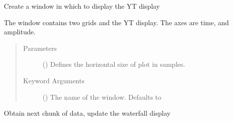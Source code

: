 \documentclass[letterpaper,10pt,english]{sphinxmanual}
\begin{document}
\begin{fulllineitems}
\label{\detokenize{index:TwoDGraph.Graph}}
Create a window in which to display the YT display

The window contains two grids and the YT display.  The axes are
time, and amplitude.
\begin{quote}\begin{description}
\item[{Parameters}] \leavevmode
{} () \textendash{} Defines the horizontal size of plot in samples.

\item[{Keyword Arguments}] \leavevmode
{} () \textendash{} The name of the window. Defaults to 

\end{description}\end{quote}

\begin{fulllineitems}
\label{\detokenize{index:TwoDGraph.Graph.np}}
\end{fulllineitems}


\begin{fulllineitems}
\label{\detokenize{index:TwoDGraph.Graph.pg}}
\end{fulllineitems}


\begin{fulllineitems}
\label{\detokenize{index:TwoDGraph.Graph.update}}
Obtain next chunk of data, update the waterfall display

\end{fulllineitems}


\end{fulllineitems}
\end{document}

